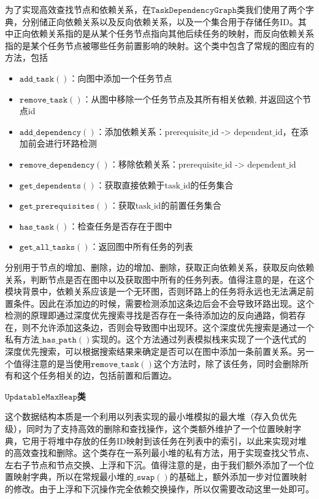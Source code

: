 \documentclass[cn,hazy,blue,10pt,normal]{elegantnote}
\begin{document}
为了实现高效查找节点和依赖关系，在$\mathtt{TaskDependencyGraph}$类我们使用了两个字典，分别储正向依赖关系以及反向依赖关系，以及一个集合用于存储任务ID。其中正向依赖关系指的是从某个任务节点指向其他后续任务的映射，而反向依赖关系指的是某个任务节点被哪些任务前置影响的映射。这个类中包含了常规的图应有的方法，包括
\begin{itemize}
    \item $\mathtt{add\_task()}$：向图中添加一个任务节点
    \item $\mathtt{remove\_task()}$：从图中移除一个任务节点及其所有相关依赖, 并返回这个节点id
    \item $\mathtt{add\_dependency()}$：添加依赖关系：$\text{prerequisite\_id}$ -> $\text{dependent\_id}$，在添加前会进行环路检测
    \item $\mathtt{remove\_dependency()}$：移除依赖关系：$\text{prerequisite\_id}$ -> $\text{dependent\_id}$
    \item $\mathtt{get\_dependents()}$：获取直接依赖于$\text{task\_id}$的任务集合
    \item $\mathtt{get\_prerequisites()}$：获取$\text{task\_id}$的前置任务集合
    \item $\mathtt{has\_task()}$：检查任务是否存在于图中
    \item $\mathtt{get\_all\_tasks()}$：返回图中所有任务的列表
\end{itemize}
分别用于节点的增加、删除，边的增加、删除，获取正向依赖关系，获取反向依赖关系，判断节点是否在图中以及获取图中所有的任务列表。值得注意的是，在这个模块背景中，依赖关系应该是一个无环图，否则环路上的任务将永远也无法满足前置条件。因此在添加边的时候，需要检测添加这条边后会不会导致环路出现。这个检测的原理即通过深度优先搜索寻找是否存在一条待添加边的反向通路，倘若存在，则不允许添加这条边，否则会导致图中出现环。这个深度优先搜索是通过一个私有方法$\mathtt{\_has\_path()}$实现的。这个方法通过列表模拟栈来实现了一个迭代式的深度优先搜索，可以根据搜索结果来确定是否可以在图中添加一条前置关系。另一个值得注意的是当使用$\mathtt{remove\_task()}$这个方法时，除了该任务，同时会删除所有和这个任务相关的边，包括前置和后置边。

\textbf{$\mathtt{UpdatableMaxHeap}$类}

这个数据结构本质是一个利用以列表实现的最小堆模拟的最大堆（存入负优先级），同时为了支持高效的删除和查找操作，这个类额外维护了一个位置映射字典，它用于将堆中存放的任务ID映射到该任务在列表中的索引，以此来实现对堆的高效查找和删除。这个类存在一系列最小堆的私有方法，用于实现查找父节点、左右子节点和节点交换、上浮和下沉。值得注意的是，由于我们额外添加了一个位置映射字典，所以在常规最小堆的$\mathtt{\_swap()}$的基础上，额外添加一步对位置映射的修改。由于上浮和下沉操作完全依赖交换操作，所以仅需要改动这里一处即可。
\end{document}
